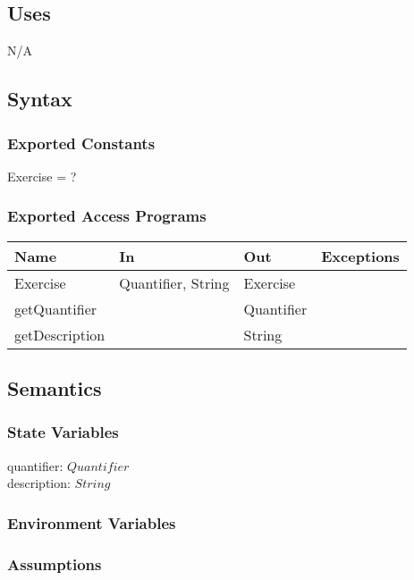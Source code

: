 \documentclass[12pt, titlepage]{article}
\begin{document}
\subsection{Uses}
N/A

\subsection{Syntax}

\subsubsection{Exported Constants}
Exercise = ?
\subsubsection{Exported Access Programs}

\begin{center}
	\begin{tabular}{p{2cm} p{4cm} p{4cm} p{2cm}}
		\hline
		\textbf{Name} & \textbf{In} & \textbf{Out} & \textbf{Exceptions} \\
		\hline
		Exercise & Quantifier, String & Exercise &  \\
		getQuantifier &  & Quantifier &  \\
		getDescription & & String & \\
		\hline
	\end{tabular}
\end{center}

\subsection{Semantics}

\subsubsection{State Variables}

quantifier: $Quantifier$ \\
description: $String$

\subsubsection{Environment Variables}

\subsubsection{Assumptions}
\end{document}
